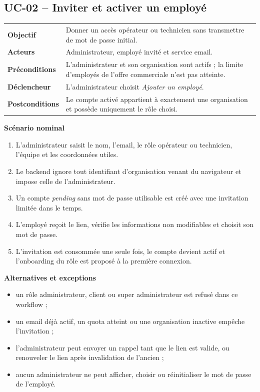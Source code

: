 \subsection{UC-02 -- Inviter et activer un employé}

\begin{table}[H]
  \centering
  \begin{tabularx}{\textwidth}{@{}C{3.3cm}Y@{}}
    \toprule
    \textbf{Objectif} & Donner un accès opérateur ou technicien sans transmettre de
    mot de passe initial.\\
    \textbf{Acteurs} & Administrateur, employé invité et service email.\\
    \textbf{Préconditions} & L'administrateur et son organisation sont actifs ; la
    limite d'employés de l'offre commerciale n'est pas atteinte.\\
    \textbf{Déclencheur} & L'administrateur choisit \emph{Ajouter un employé}.\\
    \textbf{Postconditions} & Le compte activé appartient à exactement une
    organisation et possède uniquement le rôle choisi.\\
    \bottomrule
  \end{tabularx}
\end{table}

\textbf{Scénario nominal}
\begin{enumerate}[leftmargin=8mm]
  \item L'administrateur saisit le nom, l'email, le rôle opérateur ou technicien,
  l'équipe et les coordonnées utiles.
  \item Le backend ignore tout identifiant d'organisation venant du navigateur et
  impose celle de l'administrateur.
  \item Un compte \emph{pending} sans mot de passe utilisable est créé avec une
  invitation limitée dans le temps.
  \item L'employé reçoit le lien, vérifie les informations non modifiables et choisit
  son mot de passe.
  \item L'invitation est consommée une seule fois, le compte devient actif et
  l'onboarding du rôle est proposé à la première connexion.
\end{enumerate}

\textbf{Alternatives et exceptions}
\begin{itemize}[leftmargin=7mm]
  \item un rôle administrateur, client ou super administrateur est refusé dans ce
  workflow ;
  \item un email déjà actif, un quota atteint ou une organisation inactive empêche
  l'invitation ;
  \item l'administrateur peut envoyer un rappel tant que le lien est valide, ou
  renouveler le lien après invalidation de l'ancien ;
  \item aucun administrateur ne peut afficher, choisir ou réinitialiser le mot de
  passe de l'employé.
\end{itemize}

